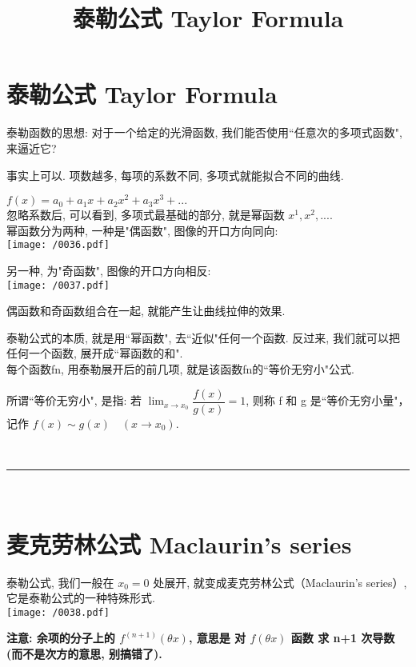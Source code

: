 \documentclass[UTF8]{ctexart}
\title{泰勒公式 Taylor Formula}
\begin{document}
\part{泰勒公式  Taylor Formula}

泰勒函数的思想: 对于一个给定的光滑函数, 我们能否使用``任意次的多项式函数", 来逼近它?

事实上可以. 项数越多, 每项的系数不同, 多项式就能拟合不同的曲线.

$f\left( x \right) =a_0+a_1x+a_2x^2+a_3x^3+...$ \\

忽略系数后, 可以看到, 多项式最基础的部分, 就是幂函数 $x^1, x^2, ...$. \\

幂函数分为两种, 一种是"偶函数", 图像的开口方向同向: \\

\texttt{[image: /0036.pdf]}

另一种, 为"奇函数", 图像的开口方向相反: \\

\texttt{[image: /0037.pdf]}

偶函数和奇函数组合在一起, 就能产生让曲线拉伸的效果.

泰勒公式的本质, 就是用``幂函数", 去``近似"任何一个函数. 反过来, 我们就可以把任何一个函数, 展开成``幂函数的和". \\

每个函数fn, 用泰勒展开后的前几项, 就是该函数fn的``等价无穷小"公式.

所谓``等价无穷小", 是指:  若 $\lim_{x \to x_0} \dfrac{f(x)} {g(x)} = 1$, 则称 f 和 g 是``等价无穷小量"，记作 $f(x) \sim g(x) \quad (x \to x_0)$.


~\\
\hrule
~\\



\part{麦克劳林公式 Maclaurin's series}

泰勒公式, 我们一般在 $x_0 =0$ 处展开, 就变成麦克劳林公式（Maclaurin's series）, 它是泰勒公式的一种特殊形式. \\

\texttt{[image: /0038.pdf]}

\textbf{注意: 余项的分子上的 $f^{\left( n+1 \right)}\left( \theta x \right) $, 意思是 对 $f(\theta x)$ 函数 求 n+1 次导数 (而不是次方的意思, 别搞错了).}
\end{document}
